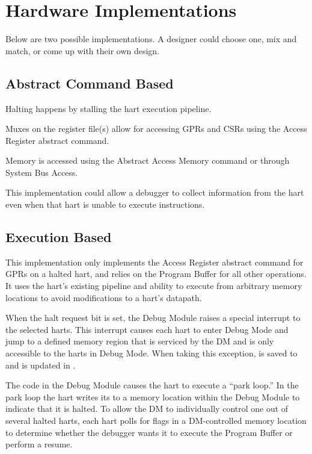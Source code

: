 \chapter{Hardware Implementations}
\label{sec:implementations}

Below are two possible implementations. A designer could choose one, mix and
match, or come up with their own design.

\section{Abstract Command Based}

Halting happens by stalling the hart execution pipeline.

Muxes on the register file(s) allow for accessing GPRs and CSRs
using the Access Register abstract command.

Memory is accessed using the Abstract Access Memory command or through System
Bus Access.

This implementation could allow a debugger to collect information from the hart
even when that hart is unable to execute instructions.

\section{Execution Based}

This implementation only implements the Access Register abstract command
for GPRs on a halted hart, and relies on the Program Buffer for all other
operations.
It uses the hart's existing pipeline
and ability to execute from arbitrary memory locations to avoid
modifications to a hart's datapath.

When the halt request bit is set, the Debug Module raises a special interrupt
to the selected harts. This interrupt causes each
hart to enter Debug Mode and jump to a defined
memory region that is serviced by the DM and is only accessible to the harts in Debug Mode.
When taking this exception, \Rpc is saved to \RcsrDpc and \FcsrDcsrCause is updated
in \RcsrDcsr.

The code in the Debug Module causes the hart to execute a ``park loop.''
In the park loop the hart writes its \Rmhartid to a
memory location within the Debug Module to indicate that it is halted.
To allow the DM to individually control one out of several
halted harts, each hart polls for flags in a DM-controlled memory location
to determine whether the debugger wants it to
execute the Program Buffer or perform a resume.

